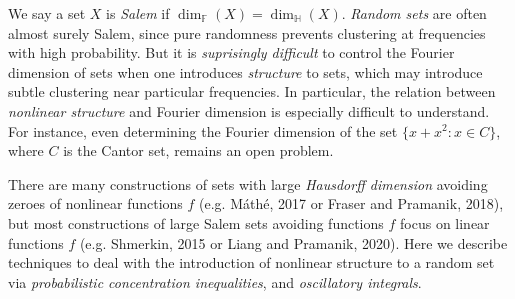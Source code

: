 \documentclass[12pt]{article}
\numberwithin{equation}{section}
\theoremstyle{plain}
\theoremstyle{remark}
\begin{document}
{{\begin{multicols}{2}
{\begin{figure}
\end{figure}


\vspace{0.1cm}

We say a set $X$ is \emph{Salem} if $\dim_{\mathbb{F}}(X) = \dim_{\mathbb{H}}(X)$. \emph{Random sets} are often almost surely Salem, since pure randomness prevents clustering at frequencies with high probability. But it is \emph{suprisingly difficult} to control the Fourier dimension of sets when one introduces \emph{structure} to sets, which may introduce subtle clustering near particular frequencies. In particular, the relation between \emph{nonlinear structure} and Fourier dimension is especially difficult to understand. For instance, even determining the Fourier dimension of the set $\{ x + x^2 : x \in C \}$, where $C$ is the Cantor set, remains an open problem.

\vspace{0.1cm}

There are many constructions of sets with large \emph{Hausdorff dimension} avoiding zeroes of nonlinear functions $f$ (e.g. M\'{a}th\'{e}, 2017 or Fraser and Pramanik, 2018), but most constructions of large Salem sets avoiding functions $f$ focus on linear functions $f$ (e.g. Shmerkin, 2015 or Liang and Pramanik, 2020). Here we describe techniques to deal with the introduction of nonlinear structure to a random set via \emph{probabilistic concentration inequalities}, and \emph{oscillatory integrals}.}




\end{multicols}}}\\
\end{document}
